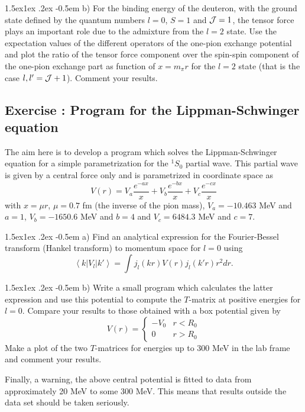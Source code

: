 \documentclass[%
oneside,                 %
final,                   %
10pt]{article}
\makeatletter
\newenvironment{doconceexercise}{}{}
\newcounter{doconceexercisecounter}
\newcommand\subex{\@startsection{paragraph}{4}{\z@}%
                  {1.5ex\@plus1ex \@minus.2ex}%
                  {-0.5em}%
                  {\normalfont\normalsize\bfseries}}
\makeatother
\begin{document}
\begin{doconceexercise}
\subex{b)}
For the binding energy of the deuteron, with the ground state defined by the quantum numbers $l=0$, $S=1$ and ${\cal J}=1$, the tensor force plays an important role due to the admixture from the $l=2$ state. Use the expectation values of the different operators of the one-pion exchange potential and plot the ratio of the tensor force component over the spin-spin component of the one-pion exchange part as function of $x=m_\pi r$ for the $l=2$ state (that is the case $l,l'={\cal J}+1$). Comment your results.


\end{doconceexercise}




\begin{doconceexercise}

\subsection*{Exercise \thedoconceexercisecounter: Program for the Lippman-Schwinger equation}


The aim here is to develop a program which solves the Lippman-Schwinger equation for a simple parametrization for the 
$^1S_0$ partial wave. This partial wave is given by a central force only and is parametrized in coordinate space as
\[
  V(r)=V_a \frac{e^{-ax}}{x}+V_b \frac{e^{-bx}}{x}+V_c \frac{e^{-cx}}{x}
\]
with $x=\mu r$, $\mu=0.7$ fm (the inverse of the pion mass),
$V_a=-10.463$ MeV and $a=1$, $V_b=-1650.6$ MeV and $b=4$ and
$V_c=6484.3$ MeV and $c=7$.


\subex{a)}
Find an analytical expression for 
the Fourier-Bessel transform (Hankel transform)
to momentum space for $l=0$ using
\[
\left\langle k \right | V_{l} \left | k' \right\rangle
= \int j_l(kr)V(r)j_l(k'r)r^2dr.
\]

\subex{b)}
Write a small program which calculates the latter expression
and use this potential to compute the $T$-matrix at positive energies
for $l=0$.
Compare your results to those obtained with a  box potential given by
\[
V(r)=\left\{ \begin{array}{cc} -V_0& r < R_0 \\
                                0  & r > R_0 \end{array} \right.
\]
Make a plot of the
two $T$-matrices for energies up to 300 MeV in the lab frame
and comment your results.

Finally, a warning, the above central potential is fitted  
to data from approximately 
20 MeV to some 300 MeV. This means that results outside
the data set should be taken seriously.



\end{doconceexercise}
\end{document}
